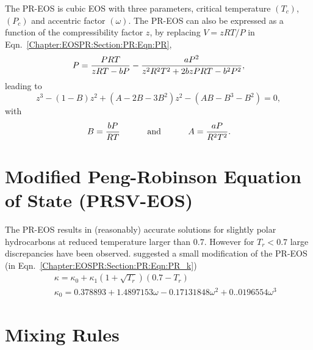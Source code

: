 The PR-EOS is cubic EOS with three parameters, critical temperature $\left(T_{c}\right)$, $\left(P_{c}\right)$ and accentric factor $\left(\omega\right)$. The PR-EOS can also be expressed as a function of the compressibility factor $z$, by replacing $V=zRT/P$ in Eqn.~\ref{Chapter:EOSPR:Section:PR:Eqn:PR},
   \begin{displaymath}
           P = \displaystyle\frac{PRT}{zRT-bP} - \displaystyle\frac{aP^{2}}{z^{2}R^{2}T^{2} +2bzPRT-b^{2}P^{2}},
   \end{displaymath} 
leading to 
   \begin{equation}
      z^{3} -\left(1-B\right)z^{2} + \left(A-2B-3B^{2}\right)z^{2} - \left(AB -B^{3} - B^{2}\right) = 0,\label{Chapter:EOSPR:Section:PR:Eqn:CubicPR_Z}
   \end{equation}
with
\begin{equation}
B = \displaystyle\frac{bP}{RT} \hspace{1cm}\text{ and }\hspace{1cm} A =\displaystyle\frac{aP}{R^{2}T^{2}}.\label{Chapter:EOSPR:Section:PR:Eqn:CubicPR_Z_Parameters}
\end{equation}

\section{Modified Peng-Robinson Equation of State (PRSV-EOS)}\label{Chapter:EOSPR:Section:PRSV}
The PR-EOS results in (reasonably) accurate solutions for slightly polar hydrocarbons at reduced temperature larger than $0.7$. However for $T_{r}<0.7$ large discrepancies have been observed. \citet[PRSV-EOS]{stryjek_1986} suggested a small modification of the PR-EOS (\ie in Eqn.~\ref{Chapter:EOSPR:Section:PR:Eqn:PR_k})
   \begin{eqnarray}
     && \kappa = \kappa_{0} + \kappa_{1}\left(1+\sqrt{T_{r}}\right)\left(0.7-T_{r}\right) \\
     && \kappa_{0} = 0.378893 + 1.4897153\omega - 0.17131848\omega^{2} + 0..0196554\omega^{3} \nonumber
   \end{eqnarray}

\section{Mixing Rules}\label{Chapter:EOSPR:Section:MixRules}



